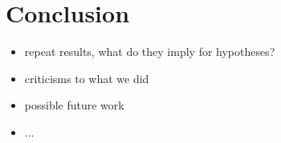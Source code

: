 \section{Conclusion}\label{sec:conclusion}
\begin{itemize}
	\item repeat results, what do they imply for hypotheses?
	\item criticisms to what we did
	\item possible future work
	\item ...
\end{itemize}